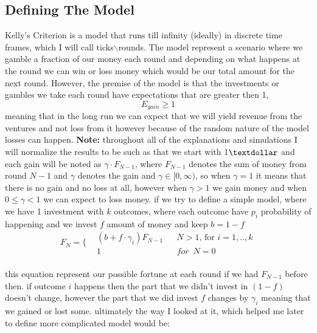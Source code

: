 \documentclass{article}
\begin{document}
	\subsection{Defining The Model}
	Kelly's Criterion is a model that runs till infinity (ideally) in discrete time frames, which I will call ticks$\backslash$rounds.
	The model represent a scenario where we gamble a fraction of our money each round and depending on what happens at the round we can win or loss money which would be our total amount for the next round.
	\newline
	However, the premise of the model is that the investments or gambles we take each round have expectations that are greater then 1,
	$$E_{gain} \ge 1$$
	meaning that in the long run we can expect that we will yield revenue from the ventures and not loss from it however because of the random nature of the model losses can happen.
	\newline
	\textbf{Note:} throughout all of the explanations and simulations I will normalize the results to be such as that we start with 1$\textdollar$ and each gain will be noted as $\gamma\cdot F_{N-1}$, where $F_{N-1}$ denotes the sum of money from round $N-1$ and $\gamma$ denotes the gain and $\gamma\in[0,\infty)$, so when $\gamma = 1$ it means that there is no gain and no loss at all, however when 
	$\gamma > 1$ we gain money and when $ 0\le \gamma < 1$ we can expect to loss money.
	\newline\newline
	if we try to define a simple model, where we have 1 investment with $k$ outcomes, where each outcome have $p_i$ probability of happening and we invest $f$ amount of money and keep $b=1-f$ 
		\begin{equation}
			\label{nes}
			F_N = \Bigg\{
			\begin{aligned}
				&(b + f\cdot \gamma _i)F_{N-1} &&N>1 \text{, for }i=1,..,k \\
				&1 &&for \enspace N=0
			\end{aligned}
		\end{equation}
	\\
	this equation represent our possible fortune at each round if we had $F_{N-1}$ before then. if outcome $i$ happens then the part that we didn't invest in $(1-f)$ doesn't change, however the part that we did invest $f$ changes by $\gamma_i$ meaning that we gained or lost some.
	\newline
	ultimately the way I looked at it, which helped me later to define more complicated model would be:\newline
\end{document}
